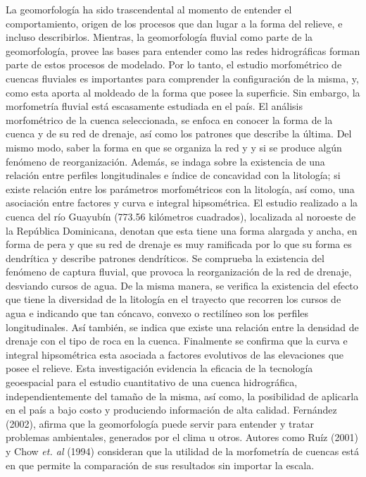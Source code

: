 \documentclass[11pt,]{article}
\renewenvironment{abstract}
 {{%
    \setlength{\leftmargin}{0mm}
    \setlength{\rightmargin}{\leftmargin}%
  }%
  \relax}
 {\endlist}
\begin{document}
\begin{abstract}

    \hbox{\vrule height .2pt width 39.14pc}

    \vskip 8.5pt %

\noindent La geomorfología ha sido trascendental al momento de entender el
comportamiento, origen de los procesos que dan lugar a la forma del
relieve, e incluso describirlos. Mientras, la geomorfología fluvial como
parte de la geomorfología, provee las bases para entender como las redes
hidrográficas forman parte de estos procesos de modelado. Por lo tanto,
el estudio morfométrico de cuencas fluviales es importantes para
comprender la configuración de la misma, y, como esta aporta al moldeado
de la forma que posee la superficie. Sin embargo, la morfometría fluvial
está escasamente estudiada en el país. El análisis morfométrico de la
cuenca seleccionada, se enfoca en conocer la forma de la cuenca y de su
red de drenaje, así como los patrones que describe la última. Del mismo
modo, saber la forma en que se organiza la red y y si se produce algún
fenómeno de reorganización. Además, se indaga sobre la existencia de una
relación entre perfiles longitudinales e índice de concavidad con la
litología; si existe relación entre los parámetros morfométricos con la
litología, así como, una asociación entre factores y curva e integral
hipsométrica. El estudio realizado a la cuenca del río Guayubín (773.56
kilómetros cuadrados), localizada al noroeste de la República
Dominicana, denotan que esta tiene una forma alargada y ancha, en forma
de pera y que su red de drenaje es muy ramificada por lo que su forma es
dendrítica y describe patrones dendríticos. Se comprueba la existencia
del fenómeno de captura fluvial, que provoca la reorganización de la red
de drenaje, desviando cursos de agua. De la misma manera, se verifica la
existencia del efecto que tiene la diversidad de la litología en el
trayecto que recorren los cursos de agua e indicando que tan cóncavo,
convexo o rectilíneo son los perfiles longitudinales. Así también, se
indica que existe una relación entre la densidad de drenaje con el tipo
de roca en la cuenca. Finalmente se confirma que la curva e integral
hipsométrica esta asociada a factores evolutivos de las elevaciones que
posee el relieve. Esta investigación evidencia la eficacia de la
tecnología geoespacial para el estudio cuantitativo de una cuenca
hidrográfica, independientemente del tamaño de la misma, así como, la
posibilidad de aplicarla en el país a bajo costo y produciendo
información de alta calidad. Fernández (2002), afirma que la
geomorfología puede servir para entender y tratar problemas ambientales,
generados por el clima u otros. Autores como Ruíz (2001) y Chow
\emph{et. al} (1994) consideran que la utilidad de la morfometría de
cuencas está en que permite la comparación de sus resultados sin
importar la escala.



\end{abstract}
\end{document}
